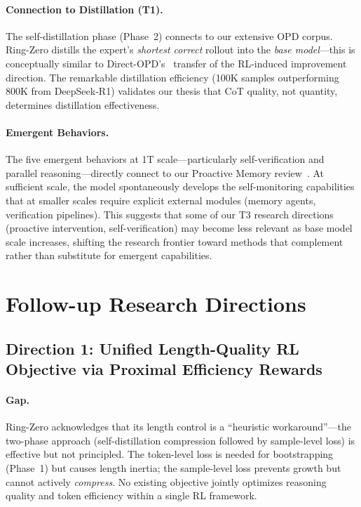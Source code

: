 \documentclass[11pt,a4paper]{article}
\begin{document}
\paragraph{Connection to Distillation (T1).} The self-distillation phase (Phase~2) connects to our extensive OPD corpus. Ring-Zero distills the expert's \emph{shortest correct} rollout into the \emph{base model}---this is conceptually similar to Direct-OPD's~\cite{directopd2026} transfer of the RL-induced improvement direction. The remarkable distillation efficiency (100K samples outperforming 800K from DeepSeek-R1) validates our thesis that CoT quality, not quantity, determines distillation effectiveness.

\paragraph{Emergent Behaviors.} The five emergent behaviors at 1T scale---particularly self-verification and parallel reasoning---directly connect to our Proactive Memory review~\cite{proactivemem2026}. At sufficient scale, the model spontaneously develops the self-monitoring capabilities that at smaller scales require explicit external modules (memory agents, verification pipelines). This suggests that some of our T3 research directions (proactive intervention, self-verification) may become less relevant as base model scale increases, shifting the research frontier toward methods that complement rather than substitute for emergent capabilities.

\section{Follow-up Research Directions}

\subsection{Direction 1: Unified Length-Quality RL Objective via Proximal Efficiency Rewards}

\paragraph{Gap.} Ring-Zero acknowledges that its length control is a ``heuristic workaround''---the two-phase approach (self-distillation compression followed by sample-level loss) is effective but not principled. The token-level loss is needed for bootstrapping (Phase~1) but causes length inertia; the sample-level loss prevents growth but cannot actively \emph{compress}. No existing objective jointly optimizes reasoning quality and token efficiency within a single RL framework.
\end{document}
